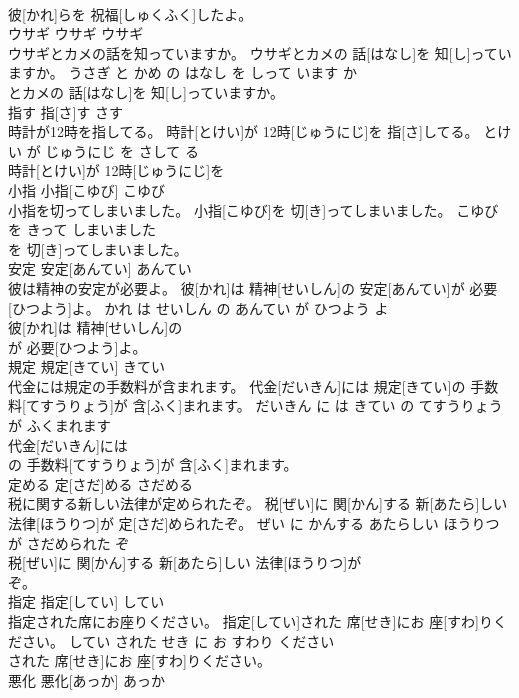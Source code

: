 \documentclass[8pt]{extreport}
\begin{document}
\begin{CJK}{UTF8}{min}
\\	彼[かれ]らを 祝福[しゅくふく]したよ。			
\\	ウサギ	ウサギ	ウサギ	
\\	ウサギとカメの話を知っていますか。	ウサギとカメの 話[はなし]を 知[し]っていますか。	うさぎ と かめ の はなし を しって います か	
\\	とカメの 話[はなし]を 知[し]っていますか。			
\\	指す	指[さ]す	さす	
\\	時計が12時を指してる。	時計[とけい]が 12時[じゅうにじ]を 指[さ]してる。	とけい が じゅうにじ を さして る	
\\	時計[とけい]が 12時[じゅうにじ]を
\\	小指	小指[こゆび]	こゆび	
\\	小指を切ってしまいました。	小指[こゆび]を 切[き]ってしまいました。	こゆび を きって しまいました	
\\	を 切[き]ってしまいました。			
\\	安定	安定[あんてい]	あんてい	
\\	彼は精神の安定が必要よ。	彼[かれ]は 精神[せいしん]の 安定[あんてい]が 必要[ひつよう]よ。	かれ は せいしん の あんてい が ひつよう よ	
\\	彼[かれ]は 精神[せいしん]の
\\	が 必要[ひつよう]よ。			
\\	規定	規定[きてい]	きてい	
\\	代金には規定の手数料が含まれます。	代金[だいきん]には 規定[きてい]の 手数料[てすうりょう]が 含[ふく]まれます。	だいきん に は きてい の てすうりょう が ふくまれます	
\\	代金[だいきん]には
\\	の 手数料[てすうりょう]が 含[ふく]まれます。			
\\	定める	定[さだ]める	さだめる	
\\	税に関する新しい法律が定められたぞ。	税[ぜい]に 関[かん]する 新[あたら]しい 法律[ほうりつ]が 定[さだ]められたぞ。	ぜい に かんする あたらしい ほうりつ が さだめられた ぞ	
\\	税[ぜい]に 関[かん]する 新[あたら]しい 法律[ほうりつ]が
\\	ぞ。			
\\	指定	指定[してい]	してい	
\\	指定された席にお座りください。	指定[してい]された 席[せき]にお 座[すわ]りください。	してい された せき に お すわり ください	
\\	された 席[せき]にお 座[すわ]りください。			
\\	悪化	悪化[あっか]	あっか	

\end{CJK}
\end{document}
